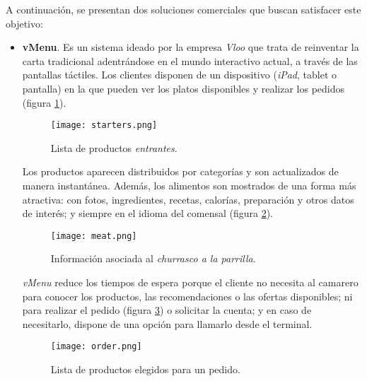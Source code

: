     A continuación, se presentan dos soluciones comerciales que buscan
    satisfacer este objetivo:

    \begin{itemize}
    \item \textbf{vMenu}. Es un sistema ideado por la empresa \emph{Vloo} que
    trata de reinventar la carta tradicional adentrándose en el mundo
    interactivo actual, a través de las pantallas táctiles. Los clientes
    disponen de un dispositivo (\emph{iPad}, tablet o pantalla) en la que
    pueden ver los platos disponibles y realizar los pedidos (figura
    \ref{fig:starters}).

    \begin{figure}[!h]
      \begin{center}
        \texttt{[image: starters.png]}
        \caption{Lista de productos \emph{entrantes}.}
        \label{fig:starters}
      \end{center}
    \end{figure}

    Los productos aparecen distribuidos por categorías y son actualizados
    de manera instantánea. Además, los alimentos son mostrados de una forma
    más atractiva: con fotos, ingredientes, recetas, calorías, preparación y 
    otros datos de interés; y siempre en el idioma del comensal (figura
    \ref{fig:meat}).

    \begin{figure}[!h]
      \begin{center}
        \texttt{[image: meat.png]}
        \caption{Información asociada al \emph{churrasco a la parrilla}.}
        \label{fig:meat}
      \end{center}
    \end{figure}
    
    \emph{vMenu} reduce los tiempos de espera porque el cliente no necesita
    al camarero para conocer los productos, las recomendaciones o las ofertas
    disponibles; ni para realizar el pedido (figura \ref{fig:order}) o
    solicitar la cuenta; y en caso de necesitarlo, dispone de una opción para
    llamarlo desde el terminal.

    \begin{figure}[!h]
      \begin{center}
        \texttt{[image: order.png]}
        \caption{Lista de productos elegidos para un pedido.}
        \label{fig:order}
      \end{center}
    \end{figure}


\end{itemize}
